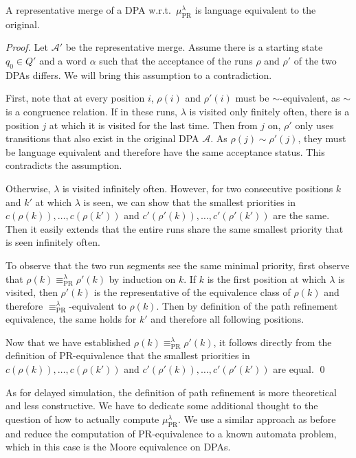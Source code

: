 \begin{theorem}
	A representative merge of a DPA w.r.t.\ $\mu_\text{PR}^\lambda$ is language equivalent to the original.
\end{theorem}

\begin{proof}
	Let $\mathcal{A}'$ be the representative merge. Assume there is a starting state $q_0 \in Q'$ and a word $\alpha$ such that the acceptance of the runs $\rho$ and $\rho'$ of the two DPAs differs. We will bring this assumption to a contradiction.
	
	First, note that at every position $i$, $\rho(i)$ and $\rho'(i)$ must be $\sim$-equivalent, as $\sim$ is a congruence relation. If in these runs, $\lambda$ is visited only finitely often, there is a position $j$ at which it is visited for the last time. Then from $j$ on, $\rho'$ only uses transitions that also exist in the original DPA $\mathcal{A}$. As $\rho(j) \sim \rho'(j)$, they must be language equivalent and therefore have the same acceptance status. This contradicts the assumption.
	
	Otherwise, $\lambda$ is visited infinitely often. However, for two consecutive positions $k$ and $k'$ at which $\lambda$ is seen, we can show that the smallest priorities in $c(\rho(k)), \dots, c(\rho(k'))$ and $c'(\rho'(k)), \dots, c'(\rho'(k'))$ are the same. Then it easily extends that the entire runs share the same smallest priority that is seen infinitely often.
	
	To observe that the two run segments see the same minimal priority, first observe that $\rho(k) \equiv_\text{PR}^\lambda \rho'(k)$ by induction on $k$. If $k$ is the first position at which $\lambda$ is visited, then $\rho'(k)$ is the representative of the equivalence class of $\rho(k)$ and therefore $\equiv_\text{PR}^\lambda$-equivalent to $\rho(k)$. Then by definition of the path refinement equivalence, the same holds for $k'$ and therefore all following positions.
	
	Now that we have established $\rho(k) \equiv_\text{PR}^\lambda \rho'(k)$, it follows directly from the definition of PR-equivalence that the smallest priorities in $c(\rho(k)), \dots, c(\rho(k'))$ and $c'(\rho'(k)), \dots, c'(\rho'(k'))$ are equal. \qed
\end{proof}

As for delayed simulation, the definition of path refinement is more theoretical and less constructive. We have to dedicate some additional thought to the question of how to actually compute $\mu_\text{PR}^\lambda$. We use a similar approach as before and reduce the computation of PR-equivalence to a known automata problem, which in this case is the Moore equivalence on DPAs.

